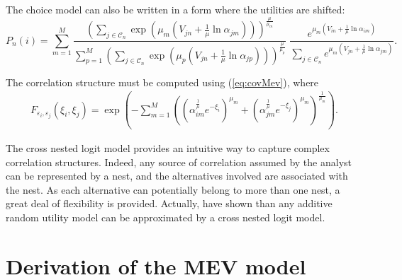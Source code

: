 \documentclass[12pt,a4paper]{article}
\newcommand{\req}[1]{(\ref{#1})}
\begin{document}
The choice model can also be written in a form where the utilities are shifted:
\begin{equation}
P_n(i)  = \sum_{m=1}^M \frac{\left(\sum_{j\in\mathcal{C}_n}{\exp(\mu_m (V_{jn}+\frac{1}{\mu}\ln \alpha_{jm}))}\right)^{\frac{\mu}{\mu_m}}}{\sum_{p=1}^M \left(\sum_{j\in\mathcal{C}_n}{\exp(\mu_p (V_{jn}+\frac{1}{\mu}\ln \alpha_{jp}))}\right)^{\frac{\mu}{\mu_p}}} \; \frac{e^{\mu_m (V_{in}+\frac{1}{\mu}\ln \alpha_{im})}}{\sum_{j\in\mathcal{C}_n} e^{\mu_m (V_{jn}+\frac{1}{\mu}\ln \alpha_{jm})}}.
\end{equation}

The correlation structure  must be computed using
\req{eq:covMev}, where
\begin{eqnarray}
\label{eq:Fijcnl}
F_{\varepsilon_i,\varepsilon_j}(\xi_i,\xi_j) =
\exp\left(-\sum_{m=1}^M \left( {(\alpha_{im}^{\frac{1}{\mu}}
e^{-\xi_i})}^{\mu_{m}} +  {(\alpha_{jm}^{\frac{1}{\mu}} e^{-\xi_j})}^{\mu_{m}}  \right)^\frac{1}{\mu_{m}}\right).
\end{eqnarray}

The cross nested logit model provides an intuitive way to capture
complex correlation structures. Indeed, any source of correlation
assumed by the analyst can be represented by a nest, and the
alternatives involved are associated with the nest. As each
alternative can potentially belong to more than one nest, a great deal
of flexibility is provided. Actually,  have
shown than any additive random utility model can be approximated by a
cross nested logit model.


\section{Derivation of the MEV model}
\label{sec:derivationMEV}
\end{document}
